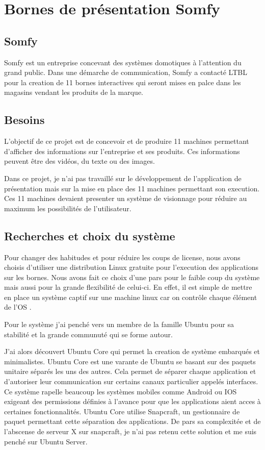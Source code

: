 \section{Bornes de présentation Somfy}

\subsection{Somfy}

Somfy est un entreprise concevant des systèmes domotiques à l'attention du grand public.
Dans une démarche de communication, Somfy a contacté LTBL pour la creation de 11 bornes interactives qui seront mises en palce dans les magasins vendant les produits de la marque.

\subsection{Besoins}

L'objectif de ce projet est de concevoir et de produire 11 machines permettant d'afficher des informations sur l'entreprise et ses produits.
Ces informations peuvent être des vidéos, du texte ou des images.

Dans ce projet, je n'ai pas travaillé sur le développement de l'application de présentation mais sur la mise en place des 11 machines permettant son execution.
Ces 11 machines devaient presenter un système de visionnage pour réduire au maximum les possibilités de l'utilisateur.

\subsection{Recherches et choix du système}

Pour changer des habitudes et pour réduire les coups de license, nous avons choisis d'utiliser une distribution Linux gratuite pour l'execution des applications sur les bornes.
Nous avons fait ce choix d'une pars pour le faible coup du système mais aussi pour la grande flexibilité de celui-ci.
En effet, il est simple de mettre en place un système captif sur une machine linux car on contrôle chaque élément de l'OS .

Pour le système j'ai penché vers un membre de la famille Ubuntu pour sa stabilité et la grande communuté qui se forme autour.

J'ai alors découvert Ubuntu Core qui permet la creation de système embarqués et minimalistes.
Ubuntu Core est une varante de Ubuntu se basant sur des paquets unitaire séparés les uns des autres.
Cela permet de séparer chaque application et d'autoriser leur communication sur certains canaux particulier appelés interfaces.
Ce système rapelle beaucoup les systèmes mobiles comme Android ou IOS exigeant des permissions définies à l'avance pour que les applications aient acces à certaines fonctionnalités.
Ubuntu Core utilise Snapcraft, un gestionnaire de paquet permettant cette séparation des applications.
De pars sa complexitée et de l'abscense de serveur X sur snapcraft, je n'ai pas retenu cette solution et me suis penché sur Ubuntu Server.

